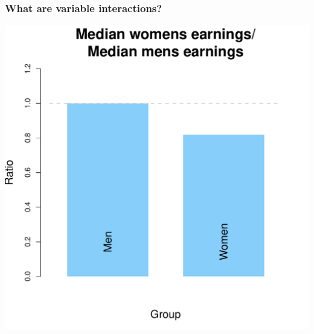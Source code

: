 \documentclass[aspectratio=169]{beamer}
\theoremstyle{principle}
\begin{document}
\begin{frame}
\frametitle{What are \textbf{variable interactions}?}

\begin{center}
\includegraphics[scale=0.4]{gender_wage_gap.pdf}
\end{center}

\end{frame}
\end{document}

